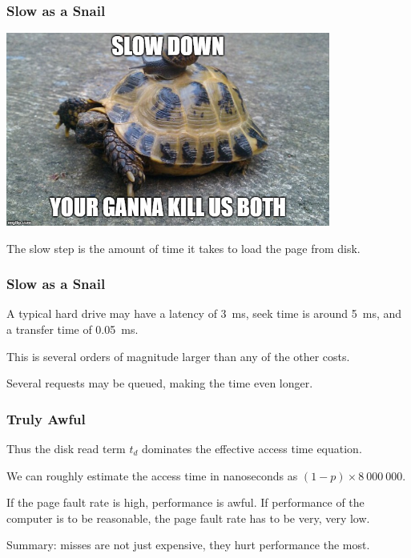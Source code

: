\begin{frame}
\frametitle{Slow as a Snail}

\begin{center}
	\includegraphics[width=0.8\textwidth]{images/slowdown.jpg}
\end{center}

The slow step is the amount of time it takes to load the page from disk. 

\end{frame}



\begin{frame}
\frametitle{Slow as a Snail}

A typical hard drive may have a latency of 3~ms, seek time is around 5~ms, and a transfer time of 0.05~ms. 

This is  several orders of magnitude larger than any of the other costs.

Several requests may be queued, making the time even longer.

\end{frame}



\begin{frame}
\frametitle{Truly Awful}


Thus the disk read term $t_{d}$ dominates the effective access time equation. 

We can roughly estimate the access time in nanoseconds as $(1-p) \times 8~000~000$. 

If the page fault rate is high, performance is awful. If performance of the computer is to be reasonable, the page fault rate has to be very, very low. 


Summary: misses are not just expensive, they hurt performance the most.

\end{frame}




